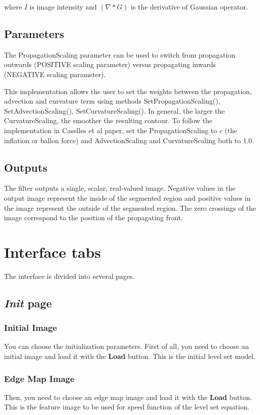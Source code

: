 \documentclass{article}
\begin{document}
where $ I $ is image intensity and $ (\nabla * G) $ is the derivative of Gaussian operator.

\subsection{Parameters}
The PropagationScaling parameter can be used to switch from propagation outwards (POSITIVE scaling parameter) versus propagating inwards (NEGATIVE scaling parameter).


This implementation allows the user to set the weights between the propagation, advection and curvature term using methods SetPropagationScaling(), SetAdvectionScaling(), SetCurvatureScaling(). In general, the larger the CurvatureScaling, the smoother the resulting contour. To follow the implementation in Caselles et al paper, set the PropagationScaling to $ c $ (the inflation or ballon force) and AdvectionScaling and CurvatureScaling both to 1.0.

\subsection{Outputs}
The filter outputs a single, scalar, real-valued image. Negative values in the output image represent the inside of the segmented region and positive values in the image represent the outside of the segmented region. The zero crossings of the image correspond to the position of the propagating front.

\section{Interface tabs}

The interface is divided into several pages.

\subsection{\emph{Init} page}

\subsubsection{Initial Image}
You can choose the initialization parameters.
First of all, you need to choose an initial image and load it with the {\bf Load} button. This is the initial level set model.

\subsubsection{Edge Map Image}
Then, you need to choose an edge map image and load it with the {\bf Load} button. This is the feature image to be used for speed function of the level set equation.
\end{document}
